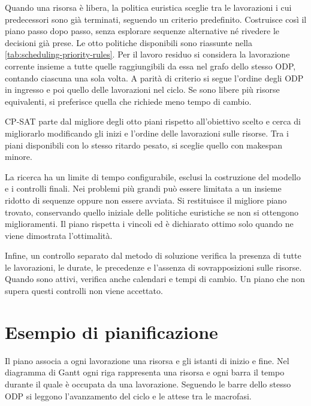 Quando una risorsa è libera, la politica euristica sceglie tra le lavorazioni i cui predecessori sono già terminati, seguendo un criterio predefinito. Costruisce così il piano passo dopo passo, senza esplorare sequenze alternative né rivedere le decisioni già prese. Le otto politiche disponibili sono riassunte nella \cref{tab:scheduling-priority-rules}. Per il lavoro residuo si considera la lavorazione corrente insieme a tutte quelle raggiungibili da essa nel grafo dello stesso ODP, contando ciascuna una sola volta. A parità di criterio si segue l'ordine degli ODP in ingresso e poi quello delle lavorazioni nel ciclo. Se sono libere più risorse equivalenti, si preferisce quella che richiede meno tempo di cambio.



CP-SAT parte dal migliore degli otto piani rispetto all'obiettivo scelto e cerca di migliorarlo modificando gli inizi e l'ordine delle lavorazioni sulle risorse. Tra i piani disponibili con lo stesso ritardo pesato, si sceglie quello con makespan minore.

La ricerca ha un limite di tempo configurabile, esclusi la costruzione del modello e i controlli finali. Nei problemi più grandi può essere limitata a un insieme ridotto di sequenze oppure non essere avviata. Si restituisce il migliore piano trovato, conservando quello iniziale delle politiche euristiche se non si ottengono miglioramenti. Il piano rispetta i vincoli ed è dichiarato ottimo solo quando ne viene dimostrata l'ottimalità.

Infine, un controllo separato dal metodo di soluzione verifica la presenza di tutte le lavorazioni, le durate, le precedenze e l'assenza di sovrapposizioni sulle risorse. Quando sono attivi, verifica anche calendari e tempi di cambio. Un piano che non supera questi controlli non viene accettato.

\section{Esempio di pianificazione}
\label{sec:scheduling-example}

Il piano associa a ogni lavorazione una risorsa e gli istanti di inizio e fine. Nel diagramma di Gantt ogni riga rappresenta una risorsa e ogni barra il tempo durante il quale è occupata da una lavorazione. Seguendo le barre dello stesso ODP si leggono l'avanzamento del ciclo e le attese tra le macrofasi.

